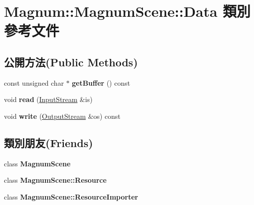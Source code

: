 \hypertarget{class_magnum_1_1_magnum_scene_1_1_data}{}\section{Magnum\+:\+:Magnum\+Scene\+:\+:Data 類別 參考文件}
\label{class_magnum_1_1_magnum_scene_1_1_data}
\subsection*{公開方法(Public Methods)}
\begin{DoxyCompactItemize}
\item 
const unsigned char $\ast$ {\bfseries get\+Buffer} () const \hypertarget{class_magnum_1_1_magnum_scene_1_1_data_af689d37a32cace0b15a8e6f955314da4}{}\label{class_magnum_1_1_magnum_scene_1_1_data_af689d37a32cace0b15a8e6f955314da4}

\item 
void {\bfseries read} (\hyperlink{class_magnum_1_1_input_stream}{Input\+Stream} \&is)\hypertarget{class_magnum_1_1_magnum_scene_1_1_data_aedfb49c8f6174996ef0bff0091873c0a}{}\label{class_magnum_1_1_magnum_scene_1_1_data_aedfb49c8f6174996ef0bff0091873c0a}

\item 
void {\bfseries write} (\hyperlink{class_magnum_1_1_output_stream}{Output\+Stream} \&os) const \hypertarget{class_magnum_1_1_magnum_scene_1_1_data_aad244dc2917e0decc9b999f5ace6528a}{}\label{class_magnum_1_1_magnum_scene_1_1_data_aad244dc2917e0decc9b999f5ace6528a}

\end{DoxyCompactItemize}
\subsection*{類別朋友(Friends)}
\begin{DoxyCompactItemize}
\item 
class {\bfseries Magnum\+Scene}\hypertarget{class_magnum_1_1_magnum_scene_1_1_data_a0f518a37dee4252bc83e1953ecf3e240}{}\label{class_magnum_1_1_magnum_scene_1_1_data_a0f518a37dee4252bc83e1953ecf3e240}

\item 
class {\bfseries Magnum\+Scene\+::\+Resource}\hypertarget{class_magnum_1_1_magnum_scene_1_1_data_ad6ab972c70e10994a4dc5940fd732571}{}\label{class_magnum_1_1_magnum_scene_1_1_data_ad6ab972c70e10994a4dc5940fd732571}

\item 
class {\bfseries Magnum\+Scene\+::\+Resource\+Importer}\hypertarget{class_magnum_1_1_magnum_scene_1_1_data_a2a9515b539dbf6a1c27e41cbdc8d4ced}{}\label{class_magnum_1_1_magnum_scene_1_1_data_a2a9515b539dbf6a1c27e41cbdc8d4ced}

\end{DoxyCompactItemize}


